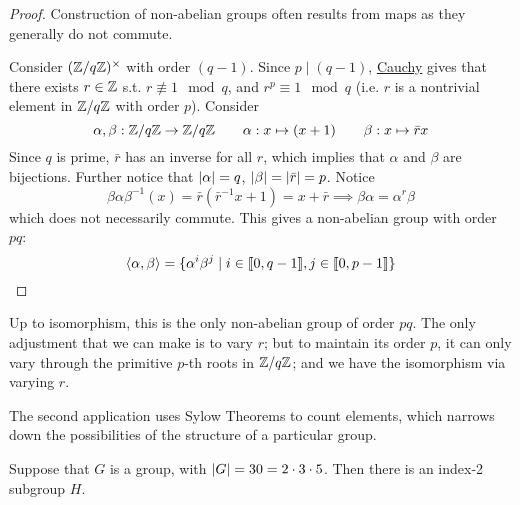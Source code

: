 \documentclass{article}
\begin{document}
\begin{proof}
    Construction of non-abelian groups often results from maps as they generally do not commute.

    Consider $(\mathbb{Z}/q\mathbb{Z})^{\times}$ with order $(q - 1)$. Since $p \mid (q-1)$, \hyperref[thm: Cauchy]{Cauchy} gives that there exists $r \in \mathbb{Z}$ s.t. $r \nequiv 1 \mod{q}$, and $r^p \equiv 1 \mod{q}$ (i.e. $r$ is a nontrivial element in $\mathbb{Z}/q\mathbb{Z}$ with order $p$). Consider
    \[
        \alpha, \beta : \mathbb{Z}/q\mathbb{Z} \to \mathbb{Z}/q\mathbb{Z} \qquad \alpha: x \mapsto (x + 1) \qquad \beta: x \mapsto \bar{r} x
    \]
    Since $q$ is prime, $\bar{r}$ has an inverse for all $r$, which implies that $\alpha$ and $\beta$ are bijections. Further notice that $\left|\alpha\right| = q$, $\left|\beta\right| = \left|\bar{r}\right| = p$. Notice
    \[
        \beta \alpha \beta^{-1}(x) = \bar{r}(\bar{r}^{-1}x + 1) = x + \bar{r} \implies \beta \alpha = \alpha^r \beta
    \]
    which does not necessarily commute. This gives a non-abelian group with order $pq$:
    \[
        \left\langle \alpha, \beta \right\rangle = \{\alpha^i \beta^j \mid i \in \llbracket 0, q-1 \rrbracket, j \in \llbracket 0, p-1 \rrbracket\}
    \]
\end{proof}

\begin{remark}
    Up to isomorphism, this is the only non-abelian group of order $pq$. The only adjustment that we can make is to vary $r$; but to maintain its order $p$, it can only vary through the primitive $p$-th roots in $\mathbb{Z}/q\mathbb{Z}$; and we have the isomorphism via varying $r$.
\end{remark}

\textstart
The second application uses Sylow Theorems to count elements, which narrows down the possibilities of the structure of a particular group.

\begin{proposition}\label{prop: gp of order 30 has index-2 subgp}
    Suppose that $G$ is a group, with $\left|G\right| = 30 = 2 \cdot 3 \cdot 5$. Then there is an index-2 subgroup $H$.
\end{proposition}
\end{document}
